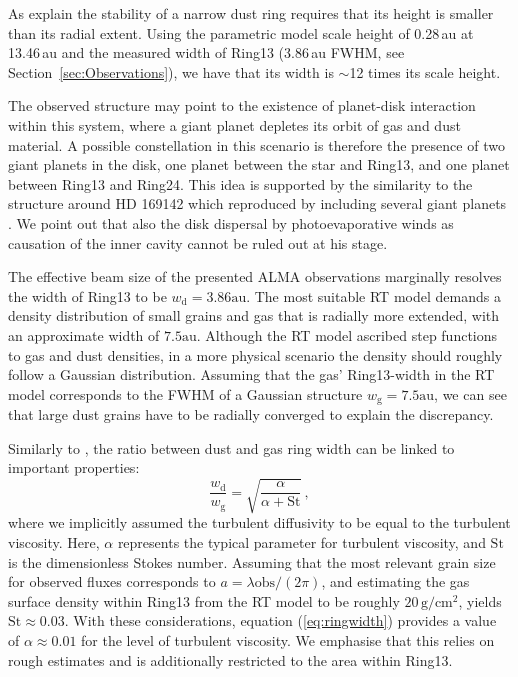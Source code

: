 \documentclass[letters,usenatbib,times]{mnras}
\begin{document}
As \citet{2018ApJ...869L..46D} explain the stability of a narrow dust ring requires that its height is smaller than its radial extent. Using the parametric model scale height of 0.28\,au at 13.46\,au and the measured width of Ring13 (3.86\,au FWHM, see Section~\ref{sec:Observations}), we have that its width is $\sim$12 times its scale height.

The observed structure may point to the existence of planet-disk interaction within this system, where a giant planet depletes its orbit of gas and dust material. A possible constellation in this scenario is therefore the presence of two giant planets in the disk, one planet between the star and Ring13, and one planet between Ring13 and Ring24. This idea is supported by the similarity to the structure around HD 169142 which \citet{bertrang_avenhaus_2018} reproduced by including several giant planets . We point out that also the disk dispersal by photoevaporative winds \citep{1994ApJ...428..654H} as causation of the inner cavity cannot be ruled out at his stage.

The effective beam size of the presented ALMA observations marginally resolves the width of Ring13 to be $w_\mathrm{d} = 3.86\mathrm{au}$. The most suitable RT model demands a density distribution of small grains and gas that is radially more extended, with an approximate width of $7.5\mathrm{au}$. Although the RT model ascribed step functions to gas and dust densities, in a more physical scenario the density should roughly follow a Gaussian distribution. Assuming that the gas' Ring13-width in the RT model corresponds to the FWHM of a Gaussian structure $w_\mathrm{g} = 7.5\mathrm{au}$, we can see that large dust grains have to be radially converged to explain the discrepancy.

Similarly to \citet{2018ApJ...869L..46D}, the ratio between dust and gas ring width can be linked to important properties:
\begin{equation}\label{eq:ringwidth}
        \frac{w_\mathrm{d}}{w_\mathrm{g}} = \sqrt{\frac{\alpha}{\alpha+\mathrm{St}}}\,,
\end{equation}
where we implicitly assumed the turbulent diffusivity to be equal to the turbulent viscosity. Here, $\alpha$ represents the typical parameter for turbulent viscosity, and $\mathrm{St}$ is the dimensionless Stokes number. Assuming that the most relevant grain size for observed fluxes corresponds to $a = \lambda \mathrm{obs}/(2 \pi)$, and estimating the gas surface density within Ring13 from the RT model to be roughly $20\,\mathrm{g}/\mathrm{cm}^2$, yields $\mathrm{St}\approx 0.03$. With these considerations, equation (\ref{eq:ringwidth}) provides a value of $\alpha \approx 0.01$ for the level of turbulent viscosity. We emphasise that this relies on rough estimates and is additionally restricted to the area within Ring13.
\end{document}
